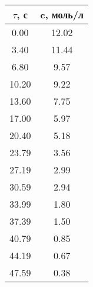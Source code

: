 \begin{table}[h]
\begin{tabular}{|c|c|}
\hline
$\tau$, с & c, моль/л \\ \hline
 0.00 &      12.02 \\ \hline 
 3.40 &      11.44 \\ \hline 
 6.80 &       9.57 \\ \hline 
10.20 &       9.22 \\ \hline 
13.60 &       7.75 \\ \hline 
17.00 &       5.97 \\ \hline 
20.40 &       5.18 \\ \hline 
23.79 &       3.56 \\ \hline 
27.19 &       2.99 \\ \hline 
30.59 &       2.94 \\ \hline 
33.99 &       1.80 \\ \hline 
37.39 &       1.50 \\ \hline 
40.79 &       0.85 \\ \hline 
44.19 &       0.67 \\ \hline 
47.59 &       0.38 \\ \hline 
\end{tabular}
\end{table}

\newpage

\newpage
